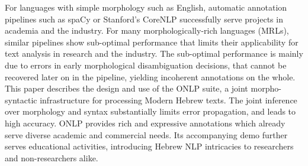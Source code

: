 For languages with simple morphology such as English, automatic annotation pipelines such as spaCy or Stanford's CoreNLP successfully serve projects in academia and the industry. 
For many morphologically-rich languages (MRLs), similar pipelines show sub-optimal performance that limits their applicability for text analysis in research and the industry. 
The sub-optimal performance is mainly due to errors in early morphological disambiguation decisions, that cannot be recovered later on in the pipeline, yielding incoherent  annotations on the whole.  This paper describes the design and use of the ONLP suite,  a joint morpho-syntactic infrastructure for processing Modern Hebrew texts. The  joint inference over morphology and syntax substantially limits error propagation, and leads to high accuracy.  ONLP provides rich and expressive annotations which already serve diverse academic  and commercial needs. Its accompanying demo further serves educational activities, introducing Hebrew NLP intricacies to researchers and non-researchers alike.